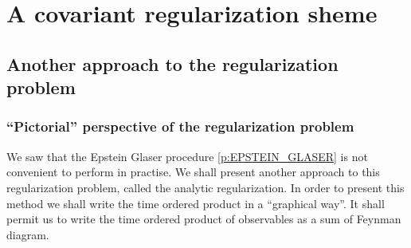 \documentclass[12pt]{book}
\theoremstyle{break}
\begin{document}
\chapter{A covariant regularization sheme}


\section{Another approach to the regularization problem}


\subsection{``Pictorial'' perspective of the regularization problem}\label{p:PIC_REG_PB}


We saw that the Epstein Glaser procedure \ref{p:EPSTEIN_GLASER} is not convenient to perform in practise. We shall present another approach to this regularization problem, called the analytic regularization. In order to present this method we shall write the time ordered product in a ``graphical way''. It shall permit us to write the time ordered product of observables as a sum of Feynman diagram. 
\end{document}
